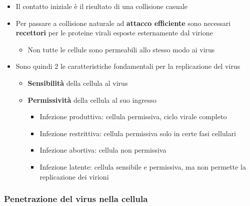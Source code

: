 \documentclass[italian,]{article}
\providecommand{\tightlist}{%
  \setlength{\itemsep}{0pt}\setlength{\parskip}{0pt}}
\begin{document}
\begin{itemize}
\tightlist
\item
  Il contatto iniziale è il risultato di una collisione casuale
\item
  Per passare a collisione naturale ad \textbf{attacco efficiente} sono
  necessari \textbf{recettori} per le proteine virali esposte
  esternamente dal virione

  \begin{itemize}
  \tightlist
  \item
    Non tutte le cellule sono permeabili allo stesso modo ai virus
  \end{itemize}
\item
  Sono quindi 2 le caratteristiche fondamentali per la replicazione del
  virus

  \begin{itemize}
  \tightlist
  \item
    \textbf{Sensibilità} della cellula al virus
  \item
    \textbf{Permissività} della cellula al suo ingresso

    \begin{itemize}
    \tightlist
    \item
      Infezione produttiva: cellula permissiva, ciclo virale completo
    \item
      Infezione restrittiva: cellula permissiva solo in certe fasi
      cellulari
    \item
      Infezione abortiva: cellula non permissiva
    \item
      Infezione latente: cellula sensibile e permissiva, ma non permette
      la replicazione dei virioni
    \end{itemize}
  \end{itemize}
\end{itemize}

\hypertarget{penetrazione-del-virus-nella-cellula}{%
\subsubsection{Penetrazione del virus nella
cellula}\label{penetrazione-del-virus-nella-cellula}}
\end{document}
